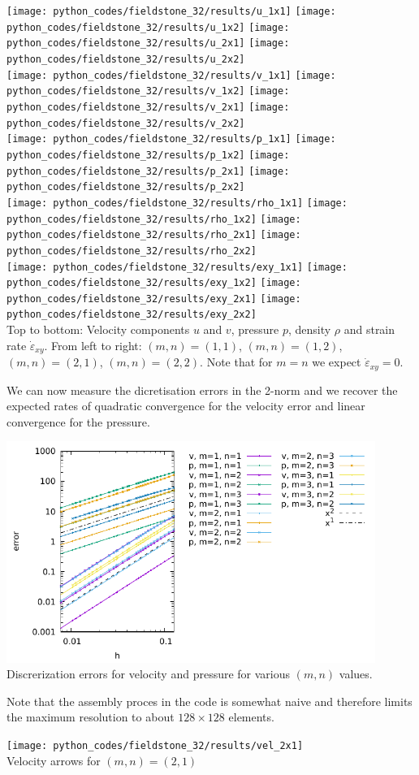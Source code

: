 \begin{center}
\texttt{[image: python\_codes/fieldstone\_32/results/u\_1x1]}
\texttt{[image: python\_codes/fieldstone\_32/results/u\_1x2]}
\texttt{[image: python\_codes/fieldstone\_32/results/u\_2x1]}
\texttt{[image: python\_codes/fieldstone\_32/results/u\_2x2]}\\
\texttt{[image: python\_codes/fieldstone\_32/results/v\_1x1]}
\texttt{[image: python\_codes/fieldstone\_32/results/v\_1x2]}
\texttt{[image: python\_codes/fieldstone\_32/results/v\_2x1]}
\texttt{[image: python\_codes/fieldstone\_32/results/v\_2x2]}\\
\texttt{[image: python\_codes/fieldstone\_32/results/p\_1x1]}
\texttt{[image: python\_codes/fieldstone\_32/results/p\_1x2]}
\texttt{[image: python\_codes/fieldstone\_32/results/p\_2x1]}
\texttt{[image: python\_codes/fieldstone\_32/results/p\_2x2]}\\
\texttt{[image: python\_codes/fieldstone\_32/results/rho\_1x1]}
\texttt{[image: python\_codes/fieldstone\_32/results/rho\_1x2]}
\texttt{[image: python\_codes/fieldstone\_32/results/rho\_2x1]}
\texttt{[image: python\_codes/fieldstone\_32/results/rho\_2x2]}\\
\texttt{[image: python\_codes/fieldstone\_32/results/exy\_1x1]}
\texttt{[image: python\_codes/fieldstone\_32/results/exy\_1x2]}
\texttt{[image: python\_codes/fieldstone\_32/results/exy\_2x1]}
\texttt{[image: python\_codes/fieldstone\_32/results/exy\_2x2]}\\
{\captionfont Top to bottom: Velocity components $u$ and $v$, pressure $p$, density $\rho$ and 
strain rate $\dot \varepsilon_{xy}$. 
From left to right: $(m,n)=(1,1)$, $(m,n)=(1,2)$, $(m,n)=(2,1)$, $(m,n)=(2,2)$.
Note that for $m=n$ we expect $\dot\varepsilon_{xy}=0$.}
\end{center}

We can now measure the dicretisation errors in the 2-norm and we recover the expected 
rates of quadratic convergence for the velocity error and linear convergence for the pressure.
\begin{center}
\includegraphics[width=12cm]{python_codes/fieldstone_32/results/errors}\\
{\captionfont Discrerization errors for velocity and pressure for various $(m,n)$ values.}
\end{center}
Note that the assembly proces in the code is somewhat naive and therefore limits
the maximum resolution to about $128\times 128$ elements.

\begin{center}
\texttt{[image: python\_codes/fieldstone\_32/results/vel\_2x1]}\\
{\captionfont Velocity arrows for $(m,n)=(2,1)$}
\end{center}
